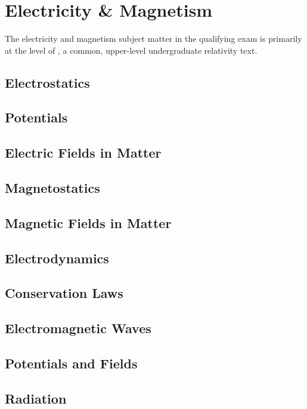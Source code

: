 \newpage
\chapter{Electricity \& Magnetism}
\label{sec:electro}
The electricity and magnetism subject matter in the qualifying exam is primarily at the level of \cite{griffithsIntroductionElectrodynamics2018}, a common, upper-level undergraduate relativity text.

\section{Electrostatics}
\section{Potentials}
\section{Electric Fields in Matter}
\section{Magnetostatics}
\section{Magnetic Fields in Matter}
\section{Electrodynamics}
\section{Conservation Laws}
\section{Electromagnetic Waves}
\section{Potentials and Fields}
\section{Radiation}

